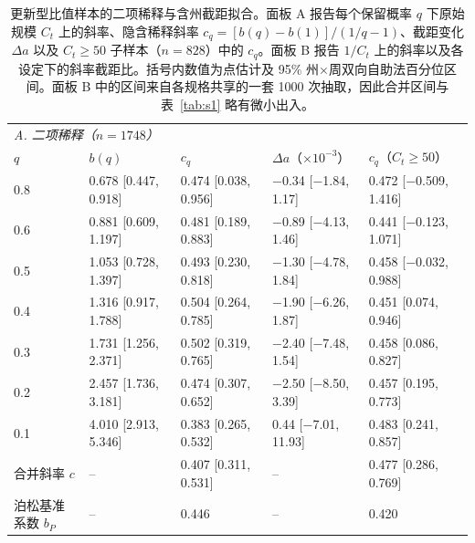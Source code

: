 \begin{table}[htbp]
\centering
\footnotesize
\setlength{\tabcolsep}{4pt}
\caption{更新型比值样本的二项稀释与含州截距拟合。面板 A 报告每个保留概率 $q$ 下原始规模 $C_t$ 上的斜率、隐含稀释斜率 $c_q=[b(q)-b(1)]/(1/q-1)$、截距变化 $\Delta a$ 以及 $C_t\ge50$ 子样本（$n=828$）中的 $c_q$。面板 B 报告 $1/C_t$ 上的斜率以及各设定下的斜率截距比。括号内数值为点估计及 95\% 州$\times$周双向自助法百分位区间。面板 B 中的区间来自各规格共享的一套 1000 次抽取，因此合并区间与表~\ref{tab:s1} 略有微小出入。}
\label{tab:s11}
\begin{tabular}{lllll}
\toprule
\multicolumn{5}{l}{\textit{A. 二项稀释（$n=1748$）}}\\
$q$ & $b(q)$ & $c_q$ & $\Delta a$（$\times10^{-3}$） & $c_q$（$C_t\ge50$） \\
\midrule
0.8 & 0.678 [0.447, 0.918] & 0.474 [0.038, 0.956] & $-$0.34 [$-$1.84, 1.17] & 0.472 [$-$0.509, 1.416] \\
0.6 & 0.881 [0.609, 1.197] & 0.481 [0.189, 0.883] & $-$0.89 [$-$4.13, 1.46] & 0.441 [$-$0.123, 1.071] \\
0.5 & 1.053 [0.728, 1.397] & 0.493 [0.230, 0.818] & $-$1.30 [$-$4.78, 1.84] & 0.458 [$-$0.032, 0.988] \\
0.4 & 1.316 [0.917, 1.788] & 0.504 [0.264, 0.785] & $-$1.90 [$-$6.26, 1.87] & 0.451 [0.074, 0.946] \\
0.3 & 1.731 [1.256, 2.371] & 0.502 [0.319, 0.765] & $-$2.40 [$-$7.48, 1.54] & 0.458 [0.086, 0.827] \\
0.2 & 2.457 [1.736, 3.181] & 0.474 [0.307, 0.652] & $-$2.50 [$-$8.50, 3.39] & 0.457 [0.195, 0.773] \\
0.1 & 4.010 [2.913, 5.346] & 0.383 [0.265, 0.532] & 0.44 [$-$7.01, 11.93] & 0.483 [0.241, 0.857] \\
\midrule
合并斜率 $c$ & -- & 0.407 [0.311, 0.531] & -- & 0.477 [0.286, 0.769] \\
泊松基准系数 $b_P$ & -- & 0.446 & -- & 0.420 \\
\bottomrule
\end{tabular}


\end{table}
